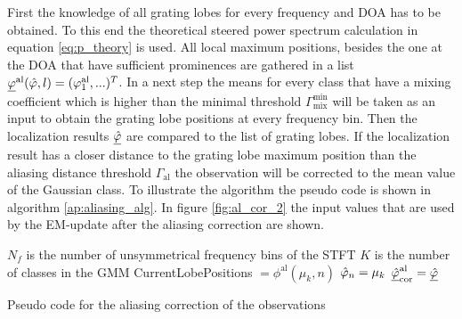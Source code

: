 First the knowledge of all grating lobes for every frequency and \ac{DOA} has to be obtained. To this end the theoretical steered power spectrum calculation in equation \ref{eq:p_theory} is used. All local maximum positions, besides the one at the \ac{DOA} that have sufficient prominences are gathered in a list $\underline{\varphi}^\text{al}(\hat{\varphi},l) = (\varphi^\text{al}_1,...)^T$. In a next step the means for every class that have a mixing coefficient which is higher than the minimal threshold  $\Gamma^\text{min}_\text{mix}$ will be taken as an input to obtain the grating lobe positions at every frequency bin. Then the localization results $\underline{\hat{\varphi}}$ are compared to the list of grating lobes. If the localization result has a closer distance to the grating lobe maximum position than the aliasing distance threshold $\Gamma_\text{al}$ the observation will be corrected to the mean value of the Gaussian class. To illustrate the algorithm the pseudo code is shown in algorithm \ref{ap:aliasing_alg}. In figure \ref{fig:al_cor_2} the input values that are used by the EM-update after the aliasing correction are shown.

\begin{algorithm}[H]
$N_f$ is the number of unsymmetrical frequency bins of the \ac{STFT}\;
$K$ is the number of classes in the GMM\;
{
  {
    {
      CurrentLobePositions $= \phi^\text{al}(\mu_k,n)$ \;
      {
        {
          $\hat{\varphi}_n = \mu_k$\;
        }
      }
    }
  }
}
$\underline{\hat{\varphi}}_\text{cor}^\text{al} = \underline{\hat{\varphi}}$\;

\caption{Pseudo code for the aliasing correction of the observations}
\label{ap:aliasing_alg}
\end{algorithm}
